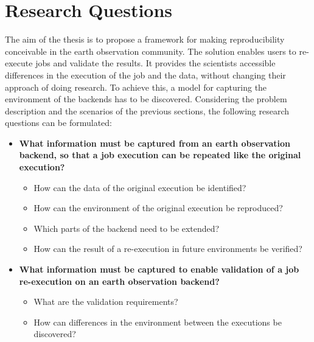 \documentclass[draft,final]{vutinfth} %
\begin{document}
\section{Research Questions}\label{research question}\label{Aim}
The aim of the thesis is to propose a framework for making reproducibility conceivable in the earth observation community. The solution enables users to re-execute jobs and validate the results. It provides the scientists accessible differences in the execution of the job and the data, without changing their approach of doing research. To achieve this, a model for capturing the environment of the backends has to be discovered. Considering the problem description and the scenarios of the previous sections, the following research questions can be formulated:

\begin{itemize}
	\item \textbf{What information must be captured from an earth observation backend, so that a job execution can be repeated like the original execution?}
	\begin{itemize}
		\item How can the data of the original execution be identified?
		\item How can the environment of the original execution be reproduced?
		\item Which parts of the backend need to be extended?
		\item How can the result of a re-execution in future environments be verified?
	\end{itemize}
	\item \textbf{What information must be captured to enable validation of a job re-execution on an earth observation backend?}
	\begin{itemize}
		\item What are the validation requirements?
		\item How can differences in the environment between the executions be discovered?
	\end{itemize}
\end{itemize}
\end{document}
